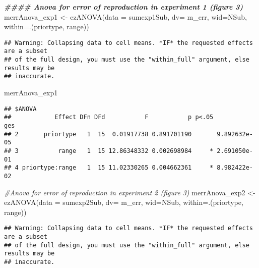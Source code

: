 \documentclass[
]{article}
\newenvironment{Shaded}{\begin{snugshade}}{\end{snugshade}}
\newcommand{\AttributeTok}[1]{\textcolor[rgb]{0.77,0.63,0.00}{#1}}
\newcommand{\CommentTok}[1]{\textcolor[rgb]{0.56,0.35,0.01}{\textit{#1}}}
\newcommand{\DocumentationTok}[1]{\textcolor[rgb]{0.56,0.35,0.01}{\textbf{\textit{#1}}}}
\newcommand{\FunctionTok}[1]{\textcolor[rgb]{0.00,0.00,0.00}{#1}}
\newcommand{\NormalTok}[1]{#1}
\newcommand{\OtherTok}[1]{\textcolor[rgb]{0.56,0.35,0.01}{#1}}
\begin{document}
\begin{Shaded}
\begin{Highlighting}[]
\DocumentationTok{\#\#\#\# Anova for error of reproduction in experiment 1 (figure 3)}
\NormalTok{merrAnova\_exp1 }\OtherTok{\textless{}{-}} \FunctionTok{ezANOVA}\NormalTok{(}\AttributeTok{data =}\NormalTok{ sumexp1Sub, }\AttributeTok{dv=}\NormalTok{ m\_err, }\AttributeTok{wid=}\NormalTok{NSub, }\AttributeTok{within=}\NormalTok{.(priortype, range))}
\end{Highlighting}
\end{Shaded}

\begin{verbatim}
## Warning: Collapsing data to cell means. *IF* the requested effects are a subset
## of the full design, you must use the "within_full" argument, else results may be
## inaccurate.
\end{verbatim}

\begin{Shaded}
\begin{Highlighting}[]
\NormalTok{merrAnova\_exp1}
\end{Highlighting}
\end{Shaded}

\begin{verbatim}
## $ANOVA
##            Effect DFn DFd           F           p p<.05          ges
## 2       priortype   1  15  0.01917738 0.891701190       9.892632e-05
## 3           range   1  15 12.86348332 0.002698984     * 2.691050e-01
## 4 priortype:range   1  15 11.02330265 0.004662361     * 8.982422e-02
\end{verbatim}

\begin{Shaded}
\begin{Highlighting}[]
\CommentTok{\#Anova for error of reproduction in experiment 2 (figure 3)}
\NormalTok{merrAnova\_exp2 }\OtherTok{\textless{}{-}} \FunctionTok{ezANOVA}\NormalTok{(}\AttributeTok{data =}\NormalTok{ sumexp2Sub, }\AttributeTok{dv=}\NormalTok{ m\_err, }\AttributeTok{wid=}\NormalTok{NSub, }\AttributeTok{within=}\NormalTok{.(priortype, range))}
\end{Highlighting}
\end{Shaded}

\begin{verbatim}
## Warning: Collapsing data to cell means. *IF* the requested effects are a subset
## of the full design, you must use the "within_full" argument, else results may be
## inaccurate.
\end{verbatim}
\end{document}
